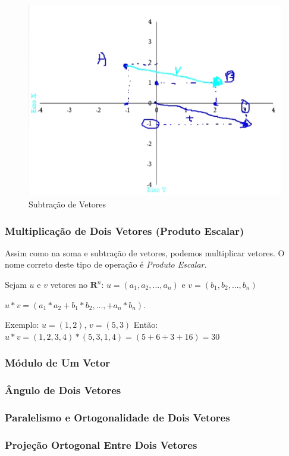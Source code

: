 \documentclass[12pt]{article}
\begin{document}
\begin{figure}
	\centering
	\includegraphics[width=0.7\linewidth]{figuras/subtracao_vetores_01}
	\caption[Subtração de Vetores]{Subtração de Vetores}
	\label{fig:subtracaovetores01}
\end{figure}

\subsubsection{Multiplicação de Dois Vetores (Produto Escalar)}

Assim como na soma e subtração de vetores, podemos multiplicar vetores. O nome correto deste tipo de operação é \textit{Produto Escalar}.

Sejam \(u\) e \(v\) vetores no \( \mathbf{R}^{n}\): \(u=(a_{1}, a_{2},...,a_{n})\) e \(v=(b_{1}, b_{2},...,b_{n})\)

\(u*v = (a_{1} * a_{2} + b_{1} * b_{2} ,..., + a_{n} * b_{n})\).

Exemplo: \(u = (1,2)\), \(v = (5, 3)\)
Então: \(u*v = (1, 2, 3, 4) * (5, 3, 1, 4) = (5 + 6 + 3 + 16) = 30\)


\subsubsection{Módulo de Um Vetor}
\subsubsection{Ângulo de Dois Vetores}
\subsubsection{Paralelismo e Ortogonalidade de Dois Vetores}
\subsubsection{Projeção Ortogonal Entre Dois Vetores}


\newpage

	
\end{document}
